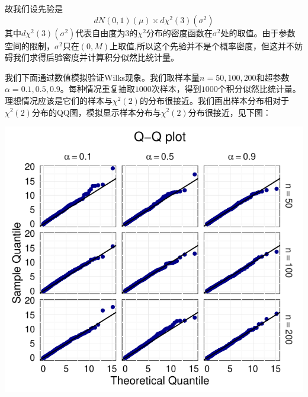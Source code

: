 \documentclass[review]{elsarticle}
\begin{document}
故我们设先验是
\begin{equation}
    dN(0,1)(\mu)\times d\chi^2(3)(\sigma^2)
\end{equation}
其中$d\chi^2(3)(\sigma^2)$代表自由度为$3$的$\chi^2$分布的密度函数在$\sigma^2$处的取值。由于参数空间的限制，$\sigma^2$只在$(0,M)$上取值,所以这个先验并不是个概率密度，但这并不妨碍我们求得后验密度并计算积分似然比统计量。

我们下面通过数值模拟验证Wilks现象。我们取样本量$n=50,100,200$和超参数$\alpha=0.1,0.5,0.9$。每种情况重复抽取$1000$次样本，得到$1000$个积分似然比统计量。理想情况应该是它们的样本与$\chi^2(2)$的分布很接近。我们画出样本分布相对于$\chi^2(2)$分布的QQ图，模拟显示样本分布与$\chi^2(2)$分布很接近，见下图：

\includegraphics{myQQPlot.pdf}
\end{document}
